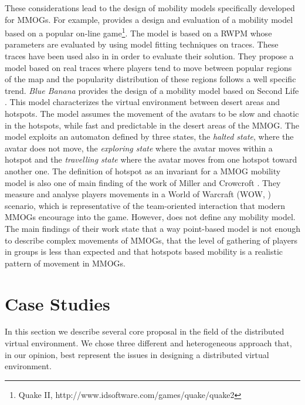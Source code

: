 \documentclass[final,10pt,a5paper]{phdimt}
\theoremstyle{definition}
\begin{document}
These considerations lead to the design of mobility models specifically developed for MMOGs.
For example, \cite{Tan2005} provides a design and evaluation of a mobility model based on a popular on-line game\footnote{Quake II, http://www.idsoftware.com/games/quake/quake2}. The model is based on a RWPM whose parameters are evaluated by using model fitting techniques on traces. These traces have been used also in \cite{Bharambea} in order to evaluate their solution. They propose a model based on real traces where players tend to move between popular regions of the map and the popularity distribution of these regions follows a well specific trend. 
\textit{Blue Banana} \cite{Legtchenko2010} provides the design of a mobility model based on Second Life \cite{sl-site}.
This model characterizes the virtual environment between desert areas and hotspots.
The model assumes the movement of the avatars to be slow and chaotic in the hotspots, while fast and predictable in the desert areas of the MMOG. The model exploits an automaton defined by three states, the {\em halted state}, where the avatar does not move, the {\em exploring state} where the avatar moves within a hotspot and the {\em travelling state} where
the avatar moves from one hotspot toward another one.
The definition of hotspot as an invariant for a MMOG mobility model is also one of main finding of the work of  Miller and Crowcroft \cite{Miller2009}. They measure and analyse players movements in a World of Warcraft (WOW, \cite{wow-site}) scenario, which is representative of the team-oriented interaction that modern MMOGs encourage into the game. 
However, \cite{Miller2009} does not define any mobility model. The main findings of their work state that a way point-based model is not enough to describe complex movements of MMOGs, that the level of gathering of players in groups is less than expected and that hotspots based mobility is a realistic pattern of movement in MMOGs.



\section{Case Studies}
\label{casestudies}

In this section we describe several core proposal in the field of the distributed virtual environment.
We chose three different and heterogeneous approach that, in our opinion, best represent the issues in designing a distributed virtual environment. 
\end{document}
